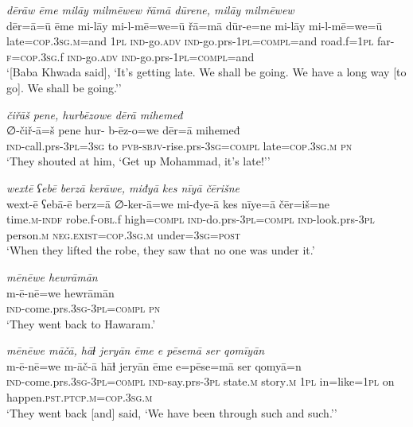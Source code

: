 \ea \label{BP.191}
\textit{dērāw ēme milāy milmēwew řāmā dūrene, milāy milmēwew} \\ 
\gll dēr=ā=ū ēme mi-lāy mi-l-mē=we=ū řā=mā dūr-e=ne mi-lāy mi-l-mē=we=ū \\ 
 late\textsc{=cop}\textsc{.3sg}\textsc{.m}=and \textsc{1pl} \textsc{ind-}go\textsc{.adv} \textsc{ind-}go.prs\textsc{-\textsc{1pl}}\textsc{=compl}=and road.f\textsc{=\textsc{1pl}} far\textsc{-f}\textsc{=cop}\textsc{.3sg}.f \textsc{ind-}go\textsc{.adv} \textsc{ind-}go.prs\textsc{-\textsc{1pl}}\textsc{=compl}=and \\ 
\glt `[Baba Khwada said], ‘It’s getting late. We shall be going. We have a long way [to go]. We shall be going.’'
\z 
 
\ea \label{BP.192}
\textit{čiřāš pene, hurbēzowe dērā mihemeđ} \\ 
\gll ∅-čiř-ā=š pene hur- b-ēz-o=we dēr=ā mihemeđ \\ 
 \textsc{ind-}call.prs\textsc{-3pl}\textsc{=3sg} to \textsc{pvb-}\textsc{sbjv-}rise.prs\textsc{-3sg}\textsc{=compl} late\textsc{=cop}\textsc{.3sg}\textsc{.m} \textsc{pn} \\ 
\glt `They shouted at him, ‘Get up Mohammad, it’s late!’'
\z 
 
\ea \label{BP.194}
\textit{wextē ʕebē berzā kerāwe, miđyā kes nīyā čērišne} \\ 
\gll wext-ē ʕebā-ē berz=ā ∅-ker-ā=we mi-đye-ā kes nīye=ā čēr=iš=ne \\ 
 time\textsc{.m}\textsc{-indf} robe.f\textsc{-obl}.f high\textsc{=compl} \textsc{ind-}do.prs\textsc{-3pl}\textsc{=compl} \textsc{ind-}look.prs\textsc{-3pl} person\textsc{.m} \textsc{\textsc{neg.}exist}\textsc{=cop}\textsc{.3sg}\textsc{.m} under\textsc{=3sg}\textsc{=\textsc{post}} \\ 
\glt `When they lifted the robe, they saw that no one was under it.'
\z 
 
\ea \label{BP.201}
\textit{mēnēwe hewrāmān} \\ 
\gll m-ē-nē=we hewrāmān \\ 
 \textsc{ind-}come.prs\textsc{.3sg}\textsc{-3pl}\textsc{=compl} \textsc{pn} \\ 
\glt `They went back to Hawaram.'
\z 
 
\ea \label{BP.202}
\textit{mēnēwe māčā, hāɫ jeryān ēme e pēsemā ser qomīyān} \\ 
\gll m-ē-nē=we m-āč-ā hāɫ jeryān ēme e=pēse=mā ser qomyā=n \\ 
 \textsc{ind-}come.prs\textsc{.3sg}\textsc{-3pl}\textsc{=compl} \textsc{ind-}say.prs\textsc{-3pl} state\textsc{.m} story\textsc{.m} \textsc{1pl} in=like\textsc{=\textsc{1pl}} on happen\textsc{.pst}\textsc{.ptcp}\textsc{.m}\textsc{=cop}\textsc{.3sg}\textsc{.m} \\ 
\glt `They went back [and] said, ‘We have been through such and such.’'
\z 
 
